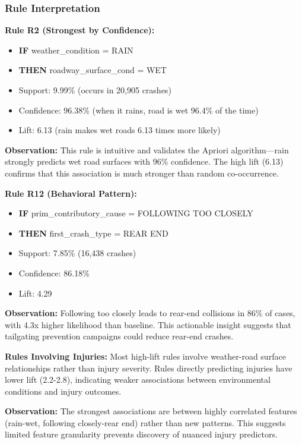 \documentclass[stu,12pt,floatsintext]{apa7}
\begin{document}
\subsubsection{Rule Interpretation}

\textbf{Rule R2 (Strongest by Confidence):}
\begin{itemize}
    \item \textbf{IF} weather\_condition = RAIN
    \item \textbf{THEN} roadway\_surface\_cond = WET
    \item Support: 9.99\% (occurs in 20,905 crashes)
    \item Confidence: 96.38\% (when it rains, road is wet 96.4\% of the time)
    \item Lift: 6.13 (rain makes wet roads 6.13 times more likely)
\end{itemize}

\textbf{Observation:} This rule is intuitive and validates the Apriori algorithm—rain strongly predicts wet road surfaces with 96\% confidence. The high lift (6.13) confirms that this association is much stronger than random co-occurrence.

\textbf{Rule R12 (Behavioral Pattern):}
\begin{itemize}
    \item \textbf{IF} prim\_contributory\_cause = FOLLOWING TOO CLOSELY
    \item \textbf{THEN} first\_crash\_type = REAR END
    \item Support: 7.85\% (16,438 crashes)
    \item Confidence: 86.18\%
    \item Lift: 4.29
\end{itemize}

\textbf{Observation:} Following too closely leads to rear-end collisions in 86\% of cases, with 4.3x higher likelihood than baseline. This actionable insight suggests that tailgating prevention campaigns could reduce rear-end crashes.

\textbf{Rules Involving Injuries:}
Most high-lift rules involve weather-road surface relationships rather than injury severity. Rules directly predicting injuries have lower lift (2.2-2.8), indicating weaker associations between environmental conditions and injury outcomes.

\textbf{Observation:} The strongest associations are between highly correlated features (rain-wet, following closely-rear end) rather than new patterns. This suggests limited feature granularity prevents discovery of nuanced injury predictors.
\end{document}
